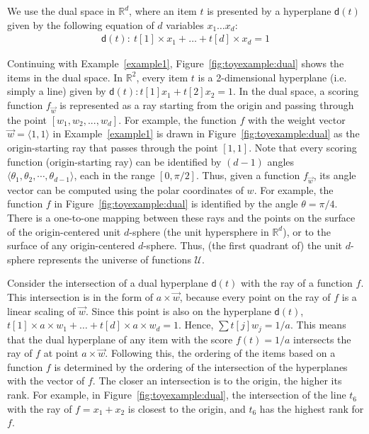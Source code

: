 We use the dual space in $\mathbb{R}^d$, where an item $t$ is presented by a hyperplane $\mathsf{d}(t)$ given by the following equation of $d$ variables $x_1 \dots x_d$:
\vspace{-5mm}
\begin{align}\label{eq:dual}
\mathsf{d}(t):~ t[1]\times x_1 + \dots + t[d]\times x_d = 1
\end{align}

Continuing with Example~\ref{example1}, Figure~\ref{fig:toyexample:dual} shows the items in the dual space. In $\mathbb{R}^2$, every item $t$ is a 2-dimensional hyperplane (i.e. simply a line) given by $\mathsf{d}(t): t[1] x_1 + t[2] x_2=1$.
In the dual space, a scoring function $f_{\vec{w}}$ is represented as a ray starting from the origin and passing through the point $[w_1, w_2,...,w_d]$.
For example, the function $f$ with the weight vector $\vec{w}=\langle 1,1 \rangle$ in Example~\ref{example1} is drawn in Figure~\ref{fig:toyexample:dual} as the origin-starting ray that passes through the point $[1,1]$. Note that every scoring function (origin-starting ray) can be identified by $(d-1)$ angles $\langle \theta_1, \theta_2, \cdots, \theta_{d-1} \rangle$, each in the range $[0,\pi/2]$. Thus, given a function $f_{\vec{w}}$, its angle vector can be computed using the polar coordinates of $w$.
For example, the function $f$ in Figure~\ref{fig:toyexample:dual} is identified by the angle $\theta=\pi/4$.
There is a one-to-one mapping between these rays and the points on the surface of the origin-centered unit $d$-sphere (the unit hypersphere in $\mathbb{R}^d$), or to the surface of any origin-centered $d$-sphere.
Thus, (the first quadrant of) the unit $d$-sphere represents the universe of functions $\mathcal{U}$.

Consider the intersection of a dual hyperplane $\mathsf{d}(t)$ with the ray of a function $f$.
This intersection is in the form of $a\times\vec{w}$, because every point on the ray of $f$ is a linear scaling of $\vec{w}$.
Since this point is also on the hyperplane $\mathsf{d}(t)$,
$t[1]\times a\times w_1 + \dots + t[d]\times a\times w_d = 1$. Hence, $\sum t[j] w_j = 1/a$. This means that the dual hyperplane of any item with the score $f(t)=1/a$ intersects the ray of $f$ at point $a\times\vec{w}$.
Following this, the ordering of the items based on a function $f$ is determined by the ordering of the intersection of the hyperplanes with the vector of $f$. The closer an intersection is to the origin, the higher its rank.
For example, in Figure~\ref{fig:toyexample:dual}, the intersection of the line $t_6$ with the ray of $f=x_1 + x_2$ is closest to the origin, and $t_6$ has the highest rank for $f$.

